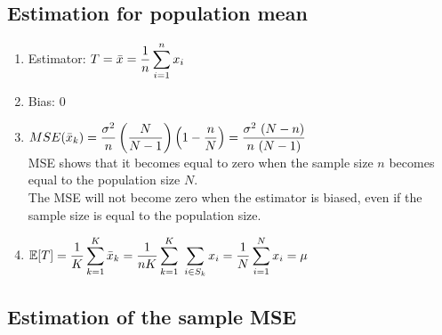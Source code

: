 \subsection{Estimation for population mean}
\begin{enumerate}
    \item Estimator: $
        T
        = \bar{x}
        = \dfrac{1}{n} \displaystyle\sum_{i=1}^n x_i
    $
    \hfill \cite{statistics/book/Statistics-for-Data-Scientists/Maurits-Kaptein}

    \item Bias: $0$
    \hfill \cite{statistics/book/Statistics-for-Data-Scientists/Maurits-Kaptein}

    \item $
        MSE(\bar{x}_k)
        = \dfrac{\sigma^2 }{n}
        \left(\dfrac{N}{N-1}\right)
        \left(1-\dfrac{n}{N}\right)
        = \dfrac{\sigma^2\ (N-n)}{n\ (N-1)}
    $
    \hfill \cite{statistics/book/Statistics-for-Data-Scientists/Maurits-Kaptein}
    \\
    MSE shows that it becomes equal to zero when the sample size $n$ becomes equal to the population size $N$.
    \hfill \cite{statistics/book/Statistics-for-Data-Scientists/Maurits-Kaptein}
    \\
    The MSE will not become zero when the estimator is biased, even if the sample size is equal to the population size.
    \hfill \cite{statistics/book/Statistics-for-Data-Scientists/Maurits-Kaptein}


    \item $
        \mathbb{E}[T]
        = \dfrac{1}{K}\displaystyle\sum_{k=1}^{K} \bar{x}_k
        = \dfrac{1}{nK}\displaystyle\sum_{k=1}^{K}\ \displaystyle\sum_{i \in S_k} x_i
        = \dfrac{1}{N}\displaystyle\sum_{i=1}^{N} x_i
        = \mu
    $
    \hfill \cite{statistics/book/Statistics-for-Data-Scientists/Maurits-Kaptein}
\end{enumerate}


\subsection{Estimation of the sample MSE}

